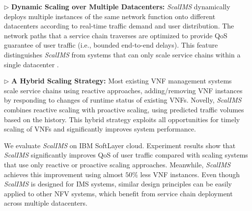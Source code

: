 $\triangleright$ \textbf{Dynamic Scaling over Multiple Datacenters:} \textit{ScalIMS} dynamically deploys multiple instances of the same network function onto different datacenters according to real-time traffic demand and user distribution. The network paths that a service chain traverses are optimized to provide QoS guarantee of user traffic (i.e., bounded end-to-end delays). This feature distinguishes \textit{ScalIMS} from systems that can only scale service chains within a single datacenter \cite{palkar2015e2, gember2012stratos}.

$\triangleright$ \textbf{A Hybrid Scaling Strategy:} Most existing VNF management systems~\cite{wood2007black}~\cite{gember2012stratos} scale service chains using reactive approaches, adding/removing VNF instances by responding to changes of runtime status of existing VNFs. Novelly, \textit{ScalIMS} combines reactive scaling with proactive scaling, using predicted traffic volumes based on the history. This hybrid strategy exploits all opportunities for timely scaling of VNFs and significantly improves system performance.

We evaluate \textit{ScalIMS} on IBM SoftLayer cloud. Experiment results show that \textit{ScalIMS} significantly improves QoS of user traffic compared with scaling systems that use only reactive or proactive scaling approaches. Meanwhile, \textit{ScalIMS} achieves this improvement %
 using almost $50\%$ less VNF instances. %
Even though \textit{ScalIMS} is designed for IMS systems, similar design principles can be easily applied to other NFV systems, which benefit from service chain deployment across multiple datacenters.


